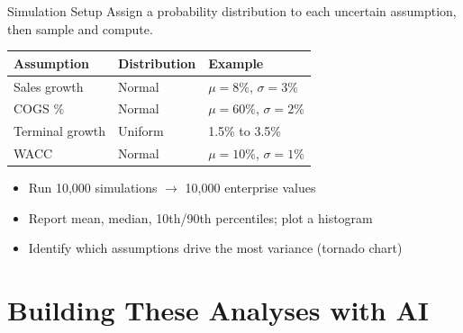 \documentclass[aspectratio=169]{beamer}
\begin{document}
\begin{frame}{Simulation Setup}
Assign a probability distribution to each uncertain assumption, then sample and compute.
\vspace{0.2cm}
\begin{center}
\small
\begin{tabular}{@{} l l l @{}}
\toprule
\textbf{Assumption} & \textbf{Distribution} & \textbf{Example} \\
\midrule
Sales growth & Normal & $\mu = 8\%$, $\sigma = 3\%$ \\
COGS \% & Normal & $\mu = 60\%$, $\sigma = 2\%$ \\
Terminal growth & Uniform & 1.5\% to 3.5\% \\
WACC & Normal & $\mu = 10\%$, $\sigma = 1\%$ \\
\bottomrule
\end{tabular}
\end{center}
\vspace{0.1cm}
\begin{itemize}
  \item Run 10{,}000 simulations $\rightarrow$ 10{,}000 enterprise values
  \item Report mean, median, 10th/90th percentiles; plot a histogram
  \item Identify which assumptions drive the most variance (tornado chart)
\end{itemize}
\end{frame}

\section{Building These Analyses with AI}
\end{document}
